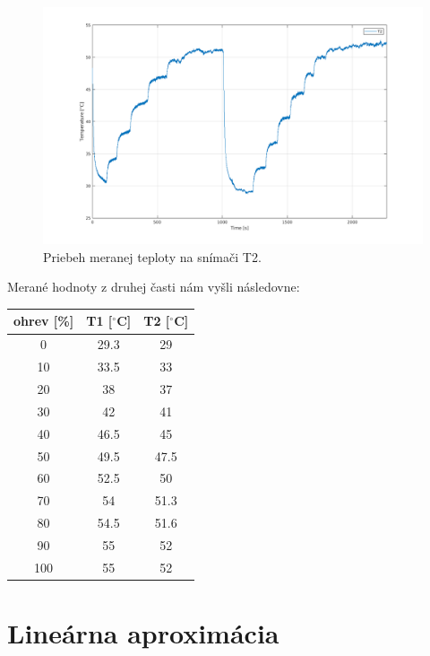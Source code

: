 \documentclass{article}
\begin{document}
\begin{figure}[!htbp]
	\begin{center}
		\includegraphics[width=\textwidth]{./include/teplota_2.png}
		\caption{Priebeh meranej teploty na snímači T2.}
		\label{fig:mt2}
	\end{center}
	\hfill
\end{figure}

Merané hodnoty z druhej časti nám vyšli následovne:

\begin{center}
\begin{tabular}{ |c|c|c| }
 \hline
 ohrev [\%] & T1 [$^\circ $C] & T2 [$^\circ $C] \\
 \hline
   0 & 29.3 & 29 \\
  10 & 33.5 & 33 \\
  20 & 38 & 37 \\
  30 & 42 & 41\\
  40 & 46.5 & 45\\
  50 & 49.5 & 47.5\\
  60 & 52.5 & 50 \\
  70 & 54 & 51.3 \\
  80 & 54.5 & 51.6 \\
  90 & 55 & 52 \\
 100 & 55 & 52 \\
 \hline
\end{tabular}
\end{center}
\newpage

\section{Lineárna aproximácia}
\label{sec:lin}
\end{document}
